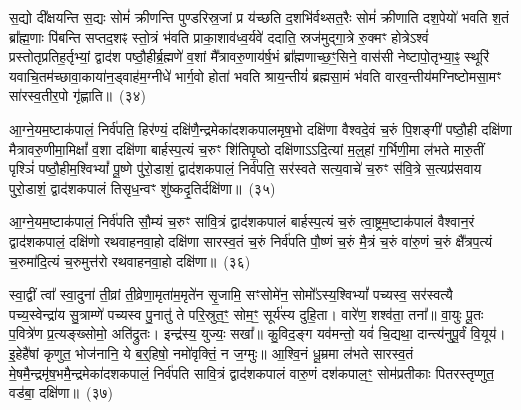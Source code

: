 {\anuvakamend[{आ॒ग्ने॒यं द्विच॑त्वारिꣳशत्}]}%

स॒द्यो दी᳚क्षयन्ति स॒द्यः सोमं॑ क्रीणन्ति पुण्डरिस्र॒जां प्र य॑च्छति द॒शभि॑र्वथ्सत॒रैः सोमं॑ क्रीणाति दश॒पेयो॑ भवति श॒तं ब्रा᳚ह्म॒णाः पि॑बन्ति सप्तद॒शꣴ स्तो॒त्रं भ॑वति प्राका॒शाव॑ध्व॒र्यवे॑ ददाति॒ स्रज॑मुद्गा॒त्रे रु॒क्मꣳ होत्रे\-ऽश्वं॑ प्रस्तोतृप्रतिह॒र्तृभ्यां॒ द्वाद॑श पष्ठौ॒हीर्ब्र॒ह्मणे॑ व॒शां मै᳚त्रावरु॒णाय॑र्\mbox{}ष॒भं ब्रा᳚ह्मणाच्छ॒ꣳ॒सिने॒ वास॑सी नेष्टापो॒तृभ्या॒ꣴ॒ स्थूरि॑ यवाचि॒तम॑च्छावा॒काया॑न॒ड्वाह॑म॒ग्नीधे॑ भार्ग॒वो होता॑ भवति श्राय॒न्तीयं॑ ब्रह्मसा॒मं भ॑वति वारव॒न्तीय॑मग्निष्टोमसा॒मꣳ सा॑रस्व॒तीर॒पो गृ॑ह्णाति॥~(३४)

{\anuvakamend[{वा॒र॒व॒न्तीयं॑ च॒त्वारि॑ च}]}%

आ॒ग्ने॒यम॒ष्टा\-क॑पालं॒ निर्व॑पति॒ हिर॑ण्यं॒ दक्षि॑णै॒न्द्रमेका॑\-दश\-कपालमृष॒भो दक्षि॑णा वैश्वदे॒वं च॒रुं पि॒शङ्गी॑ पष्ठौ॒ही दक्षि॑णा मैत्रावरु॒णीमा॒मिक्षां᳚ व॒शा दक्षि॑णा बार्\mbox{}हस्प॒त्यं च॒रुꣳ शि॑तिपृ॒ष्ठो दक्षि॑णा\-ऽऽ\-दि॒त्यां म॒ल्॒\mbox{}हां ग॒र्भिणी॒मा ल॑भते मारु॒तीं पृश्ञिं॑ पष्ठौ॒हीम॒श्वि\-भ्यां᳚ पू॒ष्णे पु॑रो॒डाशं॒ द्वाद॑श\-कपालं॒ निर्व॑पति॒ सर॑स्वते सत्य॒वाचे॑ च॒रुꣳ स॑वि॒त्रे स॒त्यप्र॑सवाय पुरो॒डाशं॒ द्वाद॑श\-कपालं तिसृध॒न्वꣳ शु॑ष्कदृ॒तिर्दक्षि॑णा॥~(३५)

{\anuvakamend[{आ॒ग्ने॒यꣳ स॒प्तच॑त्वारिꣳशत्}]}%

आ॒ग्ने॒यम॒ष्टा\-क॑पालं॒ निर्व॑पति सौ॒म्यं च॒रुꣳ सा॑वि॒त्रं द्वाद॑श\-कपालं बार्\mbox{}हस्प॒त्यं च॒रुं त्वा॒ष्ट्रम॒ष्टाक॑पालं वैश्वान॒रं द्वाद॑श\-कपालं॒ दक्षि॑णो रथवाहनवा॒हो दक्षि॑णा सारस्व॒तं च॒रुं निर्व॑पति पौ॒ष्णं च॒रुं मै॒त्रं च॒रुं वा॑रु॒णं च॒रुं क्षै᳚त्रप॒त्यं च॒रुमा॑दि॒त्यं च॒रुमुत्त॑रो रथवाहनवा॒हो दक्षि॑णा॥~(३६)

{\anuvakamend[{आ॒ग्ने॒यं चतु॑स्त्रिꣳशत्}]}%

स्वा॒द्वीं त्वा᳚ स्वा॒दुना॑ ती॒व्रां ती॒व्रेणा॒मृता॑म॒मृते॑न सृ॒जामि॒ सꣳसोमे॑न॒ सोमो᳚\-ऽस्य॒श्वि\-भ्यां᳚ पच्यस्व॒ सर॑स्वत्यै पच्य॒स्वेन्द्रा॑य सु॒त्राम्णे॑ पच्यस्व पु॒नातु॑ ते परि॒स्रुत॒ꣳ॒ सोम॒ꣳ॒ सूर्य॑स्य दुहि॒ता। वारे॑ण॒ शश्व॑ता॒ तना᳚॥ वा॒युः पू॒तः प॒वित्रे॑ण प्र॒त्यङ्ख्सोमो॒ अति॑द्रुतः। इन्द्र॑स्य॒ युज्यः॒ सखा᳚॥ कु॒विद॒ङ्ग यव॑मन्तो॒ यवं॑ चि॒द्यथा॒ दान्त्य॑नुपू॒र्वं वि॒यूय॑। इ॒हेहै॑षां कृणुत॒ भोज॑नानि॒ ये ब॒र्॒\mbox{}हिषो॒ नमो॑वृक्तिं॒ न ज॒ग्मुः॥ आ॒श्वि॒नं धू॒म्रमा ल॑भते सारस्व॒तं मे॒षमै॒न्द्रमृ॑ष॒भमै॒न्द्रमेका॑\-दश\-कपालं॒ निर्व॑पति सावि॒त्रं द्वाद॑श\-कपालं वारु॒णं दश॑\-कपाल॒ꣳ॒ सोम॑प्रतीकाः पितरस्तृप्णुत॒ वड॑बा॒ दक्षि॑णा॥~(३७)

{\anuvakamend[{भोज॑नानि॒ षड्विꣳ॑शतिश्च}]}%

